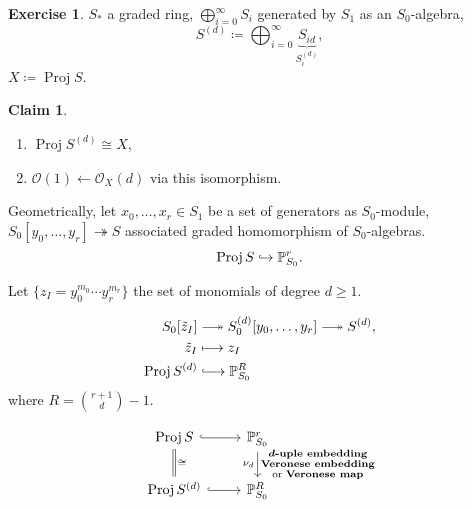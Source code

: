 \documentclass[12pt]{article}
\DeclareMathOperator{\Proj}{Proj}
\theoremstyle{definition}
\newtheorem*{claim}{Claim}
\newtheorem*{exercise}{Exercise}
\theoremstyle{remark}
\begin{document}
\begin{exercise}
$S_*$ a graded ring, $\bigoplus_{i=0}^{\infty}S_i$ generated by $S_1$ as an $S_0$-algebra,
\[S^{(d)}\coloneqq\bigoplus_{i=0}^{\infty}\underbrace{S_{id}}_{S_i^{(d)}},\]
$X\coloneqq\Proj S$.

\begin{claim}
\begin{enumerate}[label=\arabic*)]
\item $\Proj S^{(d)}\cong X$,
\item $\mathcal{O}(1)\leftarrow\mathcal{O}_X(d)$ via this isomorphism.
\end{enumerate}
\end{claim}

Geometrically, let $x_0,\ldots,x_r\in S_1$ be a set of generators as $S_0$-module, $S_0[y_0,\ldots,y_r]\twoheadrightarrow S$ associated graded homomorphism of $S_0$-algebras.
\[\Proj S\lhook\joinrel\rightarrow\mathbb{P}_{S_0}^r.\]

Let $\{z_I=y_0^{m_0}\cdots y_r^{m_r}\}$ the set of monomials of degree $d\geq1$.

\begin{align*}
S_0[\tilde{z}_I]&\relbar\joinrel\twoheadrightarrow S_0^{(d)}[y_0,\ldots,y_r]\relbar\joinrel\twoheadrightarrow S^{(d)},\\
\tilde{z}_I&\longmapsto z_I\\
\Proj S^{(d)}&\lhook\joinrel\longrightarrow\mathbb{P}_{S_0}^R
\end{align*}
where $R=\binom{r+1}{d}-1$.

\[
\begin{tikzcd}
\Proj S\arrow[r,hook]\arrow[d,-,double equal sign distance,double,"\cong"]&\mathbb{P}_{S_0}^r\arrow[d,"\substack{\boldsymbol{d}\text{\textbf{-uple embedding}}\\\text{\textbf{Veronese embedding}}\\\text{or \textbf{Veronese map}}}","\nu_d"']\\
\Proj S^{(d)}\arrow[r,hook]&\mathbb{P}_{S_0}^R
\end{tikzcd}
\]
\end{exercise}
\end{document}
